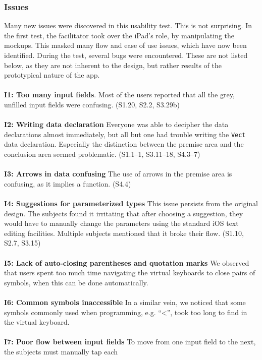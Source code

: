 \subsubsection{Issues}
\label{sec:second_issues}
Many new issues were discovered in this usability test. This is not
surprising. In the first test, the facilitator took over the iPad's role, by
manipulating the mockups. This masked many flow and ease of use issues, which
have now been identified. During the test, several bugs were encountered. These
are not listed below, as they are not inherent to the design, but rather
results of the prototypical nature of the app.
\\ \\
\textbf{I1: Too many input fields}.
Most of the users reported that all the grey, unfilled input fields were
confusing. (S1.20, S2.2, S3.29b)
\\ \\
\textbf{I2: Writing data declaration}
Everyone was able to decipher the data declarations almost immediately, but
all but one had trouble writing the \texttt{Vect} data declaration. Especially
the distinction between the premise area and the conclusion area seemed
problematic. (S1.1--1, S3.11--18, S4.3--7)
\\ \\
\textbf{I3: Arrows in data confusing}
The use of arrows in the premise area is confusing, as it implies a function. 
(S4.4)
\\ \\
\textbf{I4: Suggestions for parameterized types}
This issue persists from the original design. The subjects found it irritating
that after choosing a suggestion, they would have to manually change the
parameters using the standard iOS text editing facilities. Multiple subjects
mentioned that it broke their flow. (S1.10, S2.7, S3.15)
\\ \\
\textbf{I5: Lack of auto-closing parentheses and quotation marks}
We observed that users spent too much time navigating the virtual keyboards to
close pairs of symbols, when this can be done automatically.
\\ \\
\textbf{I6: Common symbols inaccessible}
In a similar vein, we noticed that some symbols commonly used when programming,
e.g. ``<'', took too long to find in the virtual keyboard.
\\ \\
\textbf{I7: Poor flow between input fields}
To move from one input field to the next, the subjects must manually tap each
